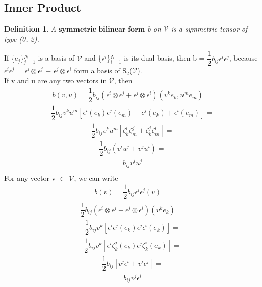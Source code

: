 \documentclass[12pt,a4paper]{article}
\newtheorem{defn}[thm]{Definition}
\begin{document}
\subsection{Inner Product}
\begin{defn}
A $\textbf{symmetric bilinear form}$ b on $\mathcal{V}$ is a symmetric tensor of type (0, 2).
\end{defn}
\indent If \{e$_j$\}$^N_{j=1}$ is a basis of $\mathcal{V}$ and \{$\epsilon^i$\}$^N_{i=1}$ is its dual basis, then b = $\dfrac{1}{2}b_{ij}\epsilon^i\epsilon^j$, because $\epsilon^i \epsilon^j $ = $\epsilon^i \otimes \epsilon^j$ + $\epsilon^j \otimes \epsilon^i$ form a basis of S$_2$($\mathcal{V}$). \\
If v and u are any two vectors in $\mathcal{V}$, then
\begin{align*} \label{prop2}
b(v,u) = \dfrac{1}{2}b_{ij}(\epsilon^i \otimes \epsilon^j + \epsilon^j \otimes \epsilon^i)(v^k e_k , u^m e_m)=
\end{align*}
\begin{align*}
\dfrac{1}{2}b_{ij}v^k u^m [ \epsilon^i (e_k) \epsilon^j (e_m) + \epsilon^j (e_k) + \epsilon^i (e_m)]=
\end{align*}
\begin{align*}
\dfrac{1}{2}b_{ij}v^k u^m [ \zeta_k^i \zeta_m^j + \zeta_k^j \zeta_m^i]=
\end{align*}
\begin{align*}
\dfrac{1}{2}b_{ij} ( v^i u ^j + v^j u^i)  =
\end{align*}
\begin{align*}
 b_{ij} v^i u^j\\
\end{align*}
For any vector v $\in$ $\mathcal{V}$, we can write
\begin{align*}
b(v) = \dfrac{1}{2}b_{ij} \epsilon^i \epsilon^j (v) =
\end{align*}
\begin{align*}
 \dfrac{1}{2}b_{ij}(\epsilon^i \otimes \epsilon^j + \epsilon^j \otimes \epsilon^i)(v^k e_k )=
 \end{align*}
 \begin{align*}
\dfrac{1}{2}b_{ij}v^k [ \epsilon^i \epsilon^j (e_k) \epsilon^j  \epsilon^i (e_k) ]=
\end{align*}
\begin{align*}
\dfrac{1}{2}b_{ij}v^k [ \epsilon^i \zeta_k^j (e_k) \epsilon^j  \zeta^i_k (e_k) ]=
\end{align*}
\begin{align*}
\dfrac{1}{2}b_{ij} [ v^j \epsilon ^i + v^i \epsilon^j]=
\end{align*}
\begin{align*}
b_{ij}v^j\epsilon^i 
\end{align*}
\end{document}

